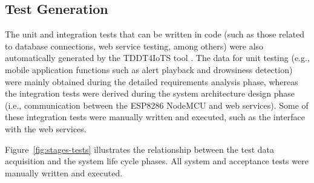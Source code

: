                 \subsection{Test Generation}
                The unit and integration tests that can be written in code (such as those related to database connections, web service testing, among others) were also automatically generated by the TDDT4IoTS tool \citep{Guerrero2024Test}. The data for unit testing (e.g., mobile application functions such as alert playback and drowsiness detection) were mainly obtained during the detailed requirements analysis phase, whereas the integration tests were derived during the system architecture design phase (i.e., communication between the ESP8286 NodeMCU and web services). Some of these integration tests were manually written and executed, such as the interface with the web services.
                
                Figure~\ref{fig:stages-tests} illustrates the relationship between the test data acquisition and the system life cycle phases. All system and acceptance tests were manually written and executed. 
                                
